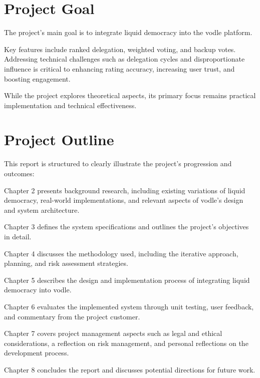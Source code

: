 \section{Project Goal}
The project's main goal is to integrate liquid democracy into the vodle platform.

Key features include ranked delegation, weighted voting, and backup votes. Addressing technical challenges such as delegation cycles and disproportionate influence is critical to enhancing rating accuracy, increasing user trust, and boosting engagement.

While the project explores theoretical aspects, its primary focus remains practical implementation and technical effectiveness.

\section{Project Outline}
This report is structured to clearly illustrate the project's progression and outcomes:

Chapter 2 presents background research, including existing variations of liquid democracy, real-world implementations, and relevant aspects of vodle's design and system architecture.

Chapter 3 defines the system specifications and outlines the project's objectives in detail.

Chapter 4 discusses the methodology used, including the iterative approach, planning, and risk assessment strategies.

Chapter 5 describes the design and implementation process of integrating liquid democracy into vodle.

Chapter 6 evaluates the implemented system through unit testing, user feedback, and commentary from the project customer.

Chapter 7 covers project management aspects such as legal and ethical considerations, a reflection on risk management, and personal reflections on the development process.

Chapter 8 concludes the report and discusses potential directions for future work.